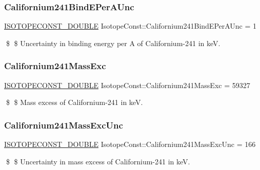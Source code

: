 \subsubsection{\texorpdfstring{Californium241\+Bind\+E\+Per\+A\+Unc}{Californium241BindEPerAUnc}}
{\footnotesize\ttfamily \mbox{\hyperlink{group___isotope_const-_macros_ga8f45a7272ce02c0b4c65c44636ed719a}{I\+S\+O\+T\+O\+P\+E\+C\+O\+N\+S\+T\+\_\+\+D\+O\+U\+B\+LE}} Isotope\+Const\+::\+Californium241\+Bind\+E\+Per\+A\+Unc = 1}

\$ \$ Uncertainty in binding energy per A of Californium-\/241 in keV. \mbox{\label{group___isotope_const-_californium-_cf241_gaac9a15941130472b9dff20502372eb86}} 
\subsubsection{\texorpdfstring{Californium241\+Mass\+Exc}{Californium241MassExc}}
{\footnotesize\ttfamily \mbox{\hyperlink{group___isotope_const-_macros_ga8f45a7272ce02c0b4c65c44636ed719a}{I\+S\+O\+T\+O\+P\+E\+C\+O\+N\+S\+T\+\_\+\+D\+O\+U\+B\+LE}} Isotope\+Const\+::\+Californium241\+Mass\+Exc = 59327}

\$ \$ Mass excess of Californium-\/241 in keV. \mbox{\label{group___isotope_const-_californium-_cf241_ga6160424ee5bba4e89b0472ff0f0e6eb4}} 
\subsubsection{\texorpdfstring{Californium241\+Mass\+Exc\+Unc}{Californium241MassExcUnc}}
{\footnotesize\ttfamily \mbox{\hyperlink{group___isotope_const-_macros_ga8f45a7272ce02c0b4c65c44636ed719a}{I\+S\+O\+T\+O\+P\+E\+C\+O\+N\+S\+T\+\_\+\+D\+O\+U\+B\+LE}} Isotope\+Const\+::\+Californium241\+Mass\+Exc\+Unc = 166}

\$ \$ Uncertainty in mass excess of Californium-\/241 in keV. \mbox{\label{group___isotope_const-_californium-_cf241_gaf7bb500a7111375e19ae5d41c76e6c42}} 
